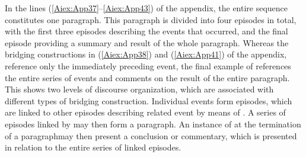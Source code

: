 \documentclass[output=paper]{LSP/langsci}
\begin{document}
	In the lines (\ref{Aiex:App37}--\ref{Aiex:App43}) of the appendix, the entire sequence constitutes one paragraph. This paragraph is divided into four episodes in total, with the first three episodes describing the events that occurred, and the final episode providing a summary and result of the whole paragraph. Whereas the bridging constructions in (\ref{Aiex:App38}) and (\ref{Aiex:App41}) of the appendix, reference only the immediately preceding event, the final example of  references the entire series of events and comments on the result of the entire paragraph. This shows two levels of discourse organization, which are associated with different types of bridging construction. Individual events form episodes, which are linked to other episodes describing related event by means of . A series of episodes linked by  may then form a paragraph. An instance of  at the termination of a paragraphmay then present a conclusion or commentary, which is presented in relation to the entire series of linked episodes.
	
\end{document}
